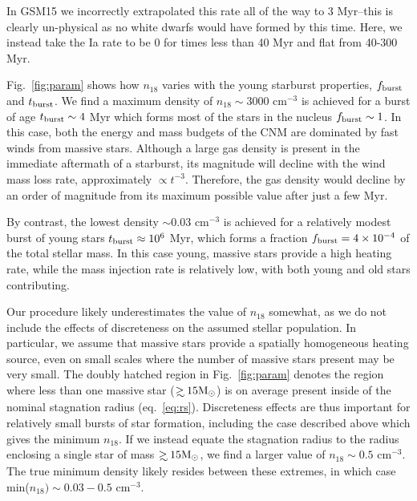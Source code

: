 \documentclass[usenatbib,fleqn]{mnras}
\newcommand\gsim{\mathrel{\rlap{\lower4pt\hbox{\hskip1pt$\sim$}}
    \raise1pt\hbox{$>$}}}
\newcommand{\Msun}{{\rm M_\odot}}
\begin{document}
In GSM15 we incorrectly extrapolated this rate all of the way to 3
Myr--this is clearly un-physical as no white dwarfs would have formed
by this time. Here, we instead take the Ia rate to be 0 for times less
than 40 Myr and flat from 40-300 Myr.

Fig.~\ref{fig:param} shows how $n_{18}$ varies with the young
starburst properties, $f_{\rm burst}$ and $t_{\rm burst}$.  We find a
maximum density of $n_{18} \sim 3000$ cm$^{-3}$ is achieved for a
burst of age $t_{\rm burst} \sim 4$ Myr which forms most of the stars
in the nucleus $f_{\rm burst} \sim 1$.  In this case, both the energy
and mass budgets of the CNM are dominated by fast winds from massive
stars.  Although a large gas density is present in the immediate
aftermath of a starburst, its magnitude will decline with the wind
mass loss rate, approximately $\propto t^{-3}$.  Therefore, the gas
density would decline by an order of magnitude from its maximum
possible value after just a few Myr.

By contrast, the lowest density $\sim 0.03$ cm$^{-3}$ is achieved for
a relatively modest burst of young stars $t_{\rm burst} \approx
10^{6}$ Myr, which forms a fraction $f_{\rm burst} = 4\times 10^{-4}$
of the total stellar mass. In this case young, massive stars provide a
high heating rate, while the mass injection rate is relatively low,
with both young and old stars contributing.

Our procedure likely underestimates the value of $n_{18}$ somewhat, as
we do not include the effects of discreteness on the assumed stellar
population.  In particular, we assume that massive stars provide a
spatially homogeneous heating source, even on small scales where the
number of massive stars present may be very small.  The doubly hatched
region in Fig.~\ref{fig:param} denotes the region where less than one
massive star ($\gsim 15 \Msun$) is on average present inside of the
nominal stagnation radius (eq.~\ref{eq:rs}).  Discreteness effects are
thus important for relatively small bursts of star formation,
including the case described above which gives the minimum $n_{18}$.
If we instead equate the stagnation radius to the radius enclosing a
single star of mass $\gsim 15 \Msun$, we find a larger value of
$n_{18}\sim 0.5$ cm$^{-3}$.  The true minimum density likely resides
between these extremes, in which case min($n_{18}) \sim 0.03-0.5$
cm$^{-3}$.
\end{document}
